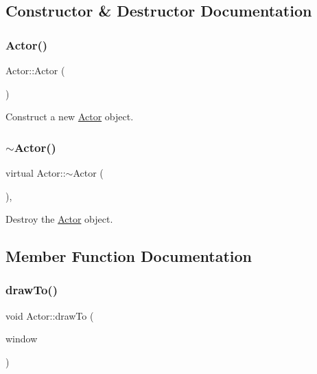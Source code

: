 \subsection{Constructor \& Destructor Documentation}
\mbox{\label{classActor_a2a0ff4335a1ee9096df90f288c026c8b}} 
\subsubsection{\texorpdfstring{Actor()}{Actor()}}
{\footnotesize\ttfamily Actor\+::\+Actor (\begin{DoxyParamCaption}{ }\end{DoxyParamCaption})}



Construct a new \mbox{\hyperlink{classActor}{Actor}} object. 

\mbox{\label{classActor_a4e8d9d909ec2c3d3205682e83bf8ff18}} 
\subsubsection{\texorpdfstring{$\sim$Actor()}{~Actor()}}
{\footnotesize\ttfamily virtual Actor\+::$\sim$\+Actor (\begin{DoxyParamCaption}{ }\end{DoxyParamCaption})\hspace{0.3cm}{\ttfamily [virtual]}, {\ttfamily [default]}}



Destroy the \mbox{\hyperlink{classActor}{Actor}} object. 



\subsection{Member Function Documentation}
\mbox{\label{classActor_af73a6f6670f0507c9e55ec2f61293535}} 
\subsubsection{\texorpdfstring{drawTo()}{drawTo()}}
{\footnotesize\ttfamily void Actor\+::draw\+To (\begin{DoxyParamCaption}\item[{sf\+::\+Render\+Window \&}]{window }\end{DoxyParamCaption})\hspace{0.3cm}{\ttfamily [virtual]}}



